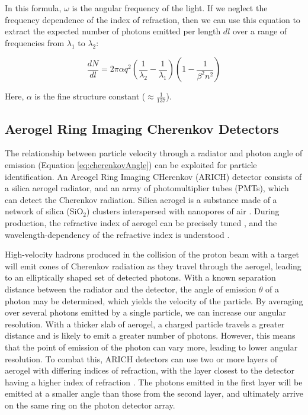 In this formula, $\omega$ is the angular frequency of the light. If we neglect the frequency dependence of the index of refraction, then we can use this equation to extract the expected number of photons emitted per length $dl$ over a range of frequencies from $\lambda_1$ to $\lambda_2$:

\begin{equation}
    \label{eq:photonNumber}
    \frac{dN}{dl}  = 2\pi\alpha q^2 \left(\frac{1}{\lambda_2} - \frac{1}{\lambda_1}
    \right)\left(1 - \frac{1}{\beta^2n^2}\right)
\end{equation}

Here, $\alpha$ is the fine structure constant ($\approx \frac{1}{137}$).



\subsection{Aerogel Ring Imaging Cherenkov Detectors}
\label{sec:ARICH}
The relationship between particle velocity through a radiator and photon angle of emission (Equation \ref{eq:cherenkovAngle}) can be exploited for particle identification. An Areogel Ring Imaging CHerenkov (ARICH) detector consists of a silica aerogel radiator, and an array of photomultiplier tubes (PMTs), which can detect the Cherenkov radiation. Silica aerogel is a substance made of a network of silica (SiO$_2$) clusters interspersed with nanopores of air \cite{aerogelRefraction}. During production, the refractive index of aerogel can be precisely tuned \cite{aerogelRefraction}, and the wavelength-dependency of the refractive index is  understood \cite{aerogelWavelength}. 

High-velocity hadrons produced in the collision of the proton beam with a target will emit cones of Cherenkov radiation as they travel through the aerogel, leading to an elliptically shaped set of detected photons. With a known separation distance between the radiator and the detector, the angle of emission $\theta$ of a photon may be determined, which yields the velocity of the particle. By averaging over several photons emitted by a single particle, we can increase our angular resolution. With a thicker slab of aerogel, a charged particle travels a greater distance and is likely to emit a greater number of photons. However, this means that the point of emission of the photon can vary more, leading to lower angular resolution. To combat this, ARICH detectors can use two or more layers of aerogel with differing indices of refraction, with the layer closest to the detector having a higher index of refraction \cite{belleArich}. The photons emitted in the first layer will be emitted at a smaller angle than those from the second layer, and ultimately arrive on the same ring on the photon detector array.

